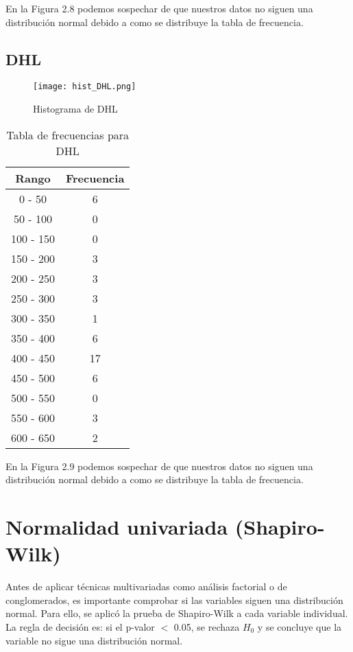 \documentclass[12pt]{report}
\begin{document}
\noindent En la Figura 2.8 podemos sospechar de que nuestros datos no siguen una distribución normal debido a como se distribuye la tabla de frecuencia. 

\subsection{DHL}
\begin{figure}[H]
    \centering
    \texttt{[image: hist\_DHL.png]}
    \caption{Histograma de DHL}
\end{figure}

\begin{table}[H]
    \centering
    \begin{tabular}{|c|c|}
        \hline
        \textbf{Rango} & \textbf{Frecuencia} \\
        \hline
        0 - 50 & 6 \\
        50 - 100 & 0 \\
        100 - 150 & 0 \\
        150 - 200 & 3 \\
        200 - 250 & 3 \\
        250 - 300 & 3 \\
        300 - 350 & 1 \\
        350 - 400 & 6 \\
        400 - 450 & 17 \\
        450 - 500 & 6 \\
        500 - 550 & 0 \\
        550 - 600 & 3 \\
        600 - 650 & 2 \\
        \hline
    \end{tabular}
    \caption{Tabla de frecuencias para DHL}
\end{table}
\noindent En la Figura 2.9 podemos sospechar de que nuestros datos no siguen una distribución normal debido a como se distribuye la tabla de frecuencia. 


\newpage

\section{Normalidad univariada (Shapiro-Wilk)}
Antes de aplicar técnicas multivariadas como análisis factorial o de conglomerados, es importante comprobar si las variables siguen una distribución normal. Para ello, se aplicó la prueba de Shapiro-Wilk a cada variable individual.\newline
La regla de decisión es: si el p-valor $<$ 0.05, se rechaza $H_0$ y se concluye que la variable no sigue una distribución normal.
\end{document}
